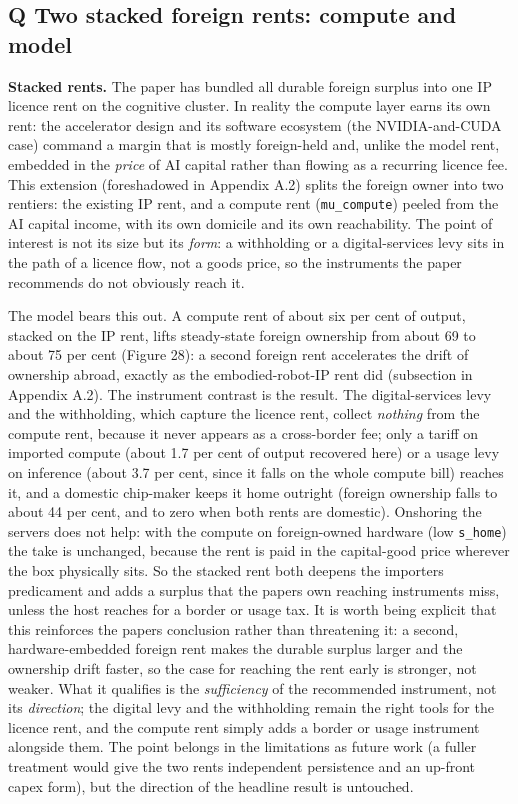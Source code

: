 \documentclass[11pt]{article}
\begin{document}
\hypertarget{q-two-stacked-foreign-rents-compute-and-model}{%
\subsection{Q \textperiodcentered{} Two stacked foreign rents: compute and
model}\label{q-two-stacked-foreign-rents-compute-and-model}}

\textbf{Stacked rents.} The paper has bundled all durable foreign surplus into one
IP licence rent on the cognitive cluster. In reality the compute layer earns its own
rent: the accelerator design and its software ecosystem (the NVIDIA-and-CUDA case)
command a margin that is mostly foreign-held and, unlike the model rent, embedded in
the \emph{price} of AI capital rather than flowing as a recurring licence fee. This
extension (foreshadowed in Appendix A.2) splits the foreign owner into two rentiers:
the existing IP rent, and a compute rent (\texttt{mu\_compute}) peeled from the AI
capital income, with its own domicile and its own reachability. The point of interest
is not its size but its \emph{form}: a withholding or a digital-services levy sits in
the path of a licence flow, not a goods price, so the instruments the paper recommends
do not obviously reach it.

The model bears this out. A compute rent of about six per cent of output, stacked on
the IP rent, lifts steady-state foreign ownership from about 69 to about 75 per cent
(Figure 28): a second foreign rent accelerates the drift of ownership abroad, exactly
as the embodied-robot-IP rent did (subsection in Appendix A.2). The instrument
contrast is the result. The digital-services levy and the withholding, which capture
the licence rent, collect \emph{nothing} from the compute rent, because it never
appears as a cross-border fee; only a tariff on imported compute (about 1.7 per cent
of output recovered here) or a usage levy on inference (about 3.7 per cent, since it
falls on the whole compute bill) reaches it, and a domestic chip-maker keeps it home
outright (foreign ownership falls to about 44 per cent, and to zero when both rents are
domestic). Onshoring the servers does not help: with the compute on foreign-owned
hardware (low \texttt{s\_home}) the take is unchanged, because the rent is paid in the
capital-good price wherever the box physically sits. So the stacked rent both deepens
the importer\textquotesingle s predicament and adds a surplus that the paper\textquotesingle s
own reaching instruments miss, unless the host reaches for a border or usage tax.
It is worth being explicit that this reinforces the paper\textquotesingle s conclusion
rather than threatening it: a second, hardware-embedded foreign rent makes the durable
surplus larger and the ownership drift faster, so the case for reaching the rent early
is stronger, not weaker. What it qualifies is the \emph{sufficiency} of the recommended
instrument, not its \emph{direction}; the digital levy and the withholding remain the
right tools for the licence rent, and the compute rent simply adds a border or usage
instrument alongside them. The point belongs in the limitations as future work (a fuller
treatment would give the two rents independent persistence and an up-front capex form),
but the direction of the headline result is untouched.
\end{document}
